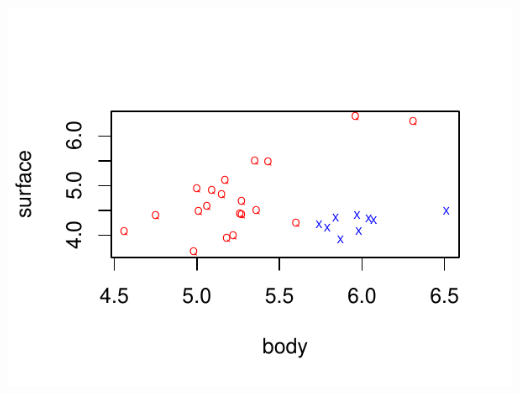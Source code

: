 \documentclass[10pt,a4paper]{article}\usepackage[]{graphicx}\usepackage[]{color}
\makeatletter
\def\maxwidth{ %
  \ifdim\Gin@nat@width>\linewidth
    \linewidth
  \else
    \Gin@nat@width
  \fi
}
\newenvironment{knitrout}{}{} %
\makeatother
\begin{document}
\begin{knitrout}
{\centering \includegraphics[width=\maxwidth]{figure/unnamed-chunk-1} 

}



\end{knitrout}
\end{document}

